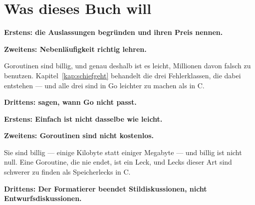 \section*{Was dieses Buch will}

\textbf{Erstens: die Auslassungen begründen und ihren Preis nennen.}

\begin{center}
\begin{minipage}{0.88\textwidth}
\end{minipage}
\end{center}

\textbf{Zweitens: Nebenläufigkeit richtig lehren.}

Goroutinen sind billig, und genau deshalb ist es leicht, Millionen davon falsch zu benutzen. Kapitel~\ref{kap:schiefgeht} behandelt die drei Fehlerklassen, die dabei entstehen --- und alle drei sind in Go leichter zu machen als in C.

\textbf{Drittens: sagen, wann Go nicht passt.}

\begin{center}
\end{center}

\begin{warnung}
\textbf{Erstens: Einfach ist nicht dasselbe wie leicht.}

\begin{center}
\begin{minipage}{0.88\textwidth}
\end{minipage}
\end{center}

\textbf{Zweitens: Goroutinen sind nicht kostenlos.}

Sie sind billig --- einige Kilobyte statt einiger Megabyte --- und billig ist nicht null. Eine Goroutine, die nie endet, ist ein Leck, und Lecks dieser Art sind schwerer zu finden als Speicherlecks in C.

\textbf{Drittens: Der Formatierer beendet Stildiskussionen, nicht Entwurfsdiskussionen.}

\begin{center}
\end{center}
\end{warnung}

